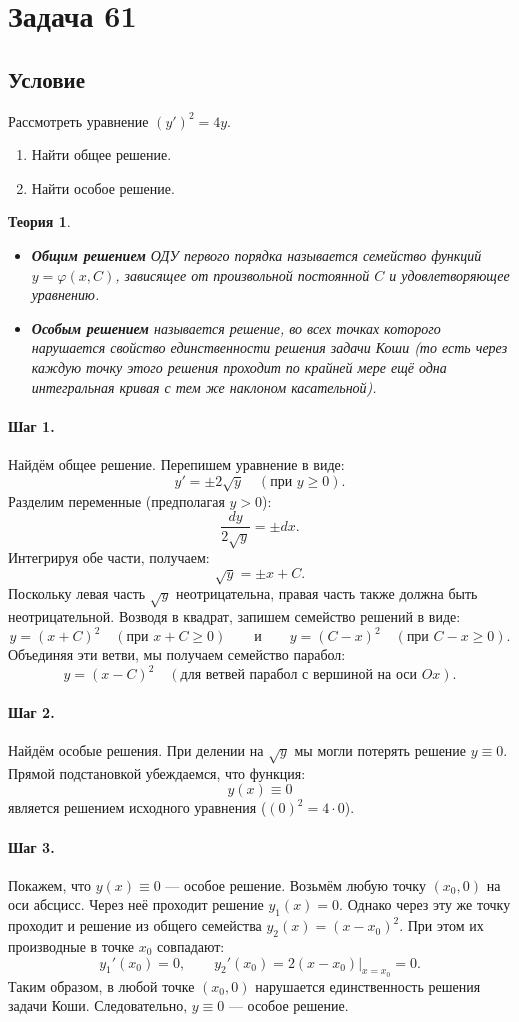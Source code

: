 \documentclass[12pt,a4paper]{article}
\theoremstyle{solution}
\newtheorem*{theory}{Теория}
\newcommand{\task}[1]{\newpage\section*{Задача #1}}
\newcommand{\step}[1]{\paragraph{Шаг #1.}}
\begin{document}
\task{61}
\subsection*{Условие}
Рассмотреть уравнение $(y')^2 = 4y$.
\begin{enumerate}
    \item Найти общее решение.
    \item Найти особое решение.
\end{enumerate}

\begin{theory}
\begin{itemize}
    \item \textbf{Общим решением} ОДУ первого порядка называется семейство функций $y = \varphi(x, C)$, зависящее от произвольной постоянной $C$ и удовлетворяющее уравнению.
    \item \textbf{Особым решением} называется решение, во всех точках которого нарушается свойство единственности решения задачи Коши (то есть через каждую точку этого решения проходит по крайней мере ещё одна интегральная кривая с тем же наклоном касательной).
\end{itemize}
\end{theory}

\step{1} Найдём общее решение. Перепишем уравнение в виде:
\[
y' = \pm 2\sqrt{y} \quad (\text{при } y \geq 0).
\]
Разделим переменные (предполагая $y > 0$):
\[
\frac{dy}{2\sqrt{y}} = \pm dx.
\]
Интегрируя обе части, получаем:
\[
\sqrt{y} = \pm x + C.
\]
Поскольку левая часть $\sqrt{y}$ неотрицательна, правая часть также должна быть неотрицательной. Возводя в квадрат, запишем семейство решений в виде:
\[
y = (x + C)^2 \quad (\text{при } x + C \geq 0) \qquad \text{и} \qquad y = (C - x)^2 \quad (\text{при } C - x \geq 0).
\]
Объединяя эти ветви, мы получаем семейство парабол:
\[
y = (x - C)^2 \quad (\text{для ветвей парабол с вершиной на оси } Ox).
\]

\step{2} Найдём особые решения. 
При делении на $\sqrt{y}$ мы могли потерять решение $y \equiv 0$. Прямой подстановкой убеждаемся, что функция:
\[
y(x) \equiv 0
\]
является решением исходного уравнения ($(0)^2 = 4\cdot 0$).

\step{3} Покажем, что $y(x) \equiv 0$ — особое решение.
Возьмём любую точку $(x_0, 0)$ на оси абсцисс. Через неё проходит решение $y_1(x) = 0$. Однако через эту же точку проходит и решение из общего семейства $y_2(x) = (x - x_0)^2$. При этом их производные в точке $x_0$ совпадают:
\[
y_1'(x_0) = 0, \qquad y_2'(x_0) = \left. 2(x - x_0) \right|_{x=x_0} = 0.
\]
Таким образом, в любой точке $(x_0, 0)$ нарушается единственность решения задачи Коши. Следовательно, $y \equiv 0$ — особое решение.
\end{document}
